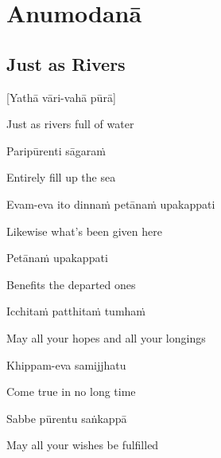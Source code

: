 
\chapter{Anumodanā}
\clearpage

\section{Just as Rivers}
\label{just-as-rivers}

[Yathā vāri-vahā pūrā]

\begin{english}
  Just as rivers full of water
\end{english}

Paripūrenti sāgaraṁ

\begin{english}
  Entirely fill up the sea
\end{english}

Evam-eva ito dinnaṁ petānaṁ upakappati

\begin{english}
  Likewise what's been given here\hyperlink{endnote113-appendix}{\hypertarget{endnote113-body}{}}
\end{english}

Petānaṁ upakappati

\begin{english}
  Benefits the departed ones\hyperlink{endnote114-appendix}{\hypertarget{endnote114-body}{}}
\end{english}


Icchitaṁ patthitaṁ tumhaṁ

\begin{english}
  May all your hopes and all your longings
\end{english}

Khippam-eva samijjhatu

\begin{english}
  Come true in no long time
\end{english}

Sabbe pūrentu saṅkappā

\begin{english}
  May all your wishes be fulfilled
\end{english}

